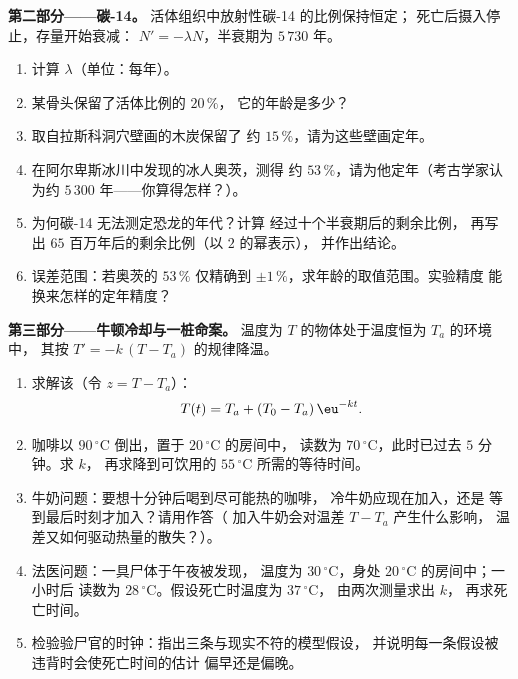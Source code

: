 \begin{problem}
\medskip
\noindent\textbf{第二部分——碳-14。}
活体组织中放射性碳-14 的比例保持恒定；
死亡后摄入停止，存量开始衰减：
$N' = -\lambda N$，半衰期为 $5\,730$ 年。
\begin{enumerate}[resume]
  \item 计算 $\lambda$（单位：每年）。
  \item 某骨头保留了活体比例的 $20\,\%$，
        它的年龄是多少？
  \item 取自拉斯科洞穴壁画的木炭保留了
        约 $15\,\%$，请为这些壁画定年。
  \item 在阿尔卑斯冰川中发现的冰人奥茨，测得
        约 $53\,\%$，请为他定年（考古学家认为约
        $5\,300$ 年——你算得怎样？）。
  \item 为何碳-14 无法测定恐龙的年代？计算
        经过十个半衰期后的剩余比例，
        再写出 $65$ 百万年后的剩余比例（以 $2$ 的幂表示），
        并作出结论。
  \item 误差范围：若奥茨的 $53\,\%$ 仅精确到
        $\pm 1\,\%$，求年龄的取值范围。实验精度
        能换来怎样的定年精度？
\end{enumerate}

\medskip
\noindent\textbf{第三部分——牛顿冷却与一桩命案。}
温度为 $T$ 的物体处于温度恒为 $T_a$ 的环境中，
其按 $T' = -k\,(T - T_a)$ 的规律降温。
\begin{enumerate}[resume]
  \item 求解该（令 $z = T - T_a$）：
        \[
        T(t) = T_a + (T_0 - T_a)\,\eu^{-kt} .
        \]
  \item 咖啡以 $90\,^\circ$C 倒出，置于 $20\,^\circ$C 的房间中，
        读数为 $70\,^\circ$C，此时已过去 $5$ 分钟。求 $k$，
        再求降到可饮用的
        $55\,^\circ$C 所需的等待时间。
  \item 牛奶问题：要想十分钟后喝到尽可能热的咖啡，
        冷牛奶应现在加入，还是
        等到最后时刻才加入？请用作答（
        加入牛奶会对温差 $T - T_a$ 产生什么影响，
        温差又如何驱动热量的散失？）。
  \item 法医问题：一具尸体于午夜被发现，
        温度为 $30\,^\circ$C，身处 $20\,^\circ$C 的房间中；一小时后
        读数为 $28\,^\circ$C。假设死亡时温度为 $37\,^\circ$C，
        由两次测量求出 $k$，
        再求死亡时间。
  \item 检验验尸官的时钟：指出三条与现实不符的模型假设，
        并说明每一条假设被违背时会使死亡时间的估计
        偏早还是偏晚。
\end{enumerate}


\end{problem}
